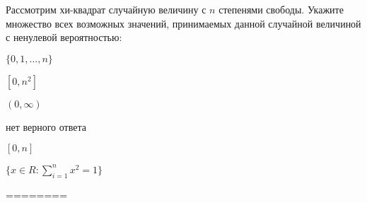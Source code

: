 
\begin{question}
Рассмотрим хи-квадрат случайную величину с \(n\) степенями свободы.
Укажите множество всех возможных значений, принимаемых данной случайной
величиной с ненулевой вероятностью:
\begin{answerlist}
  \item \(\{0, 1, \ldots, n\}\)
  \item \([0,n^2]\)
  \item \((0, \infty)\)
  \item нет верного ответа
  \item \([0,n]\)
  \item \(\{x\in R:\sum_{i=1}^{n}{x_{{}}^{2}}=1\}\)
\end{answerlist}
\end{question}

\begin{solution}
========
\end{solution}


